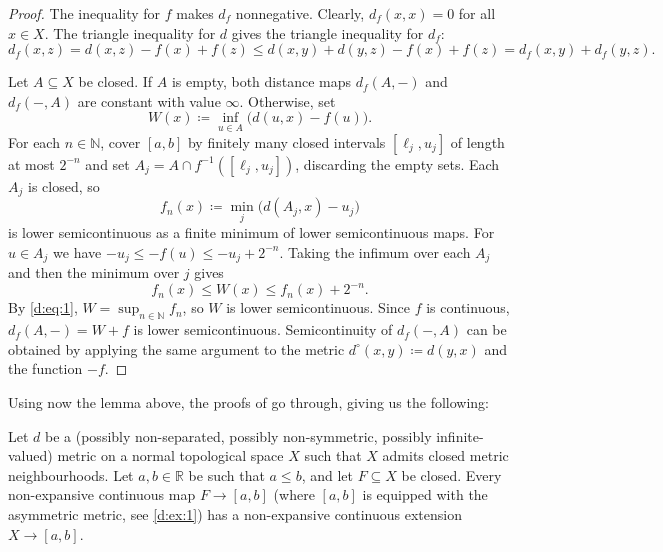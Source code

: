 \documentclass[11pt]{amsart}
\theoremstyle{definition}
\newcommand{\N}{\mathbb{N}}
\newcommand{\R}{\mathbb{R}}
\begin{document}
\begin{proof}
  The inequality for $f$ makes $d_f$ nonnegative.
  Clearly, $d_f(x,x) = 0$ for all $x \in X$.
  The triangle inequality for $d$ gives the triangle inequality for $d_f$:
  \[
    d_f(x,z) = d(x,z) - f(x) + f(z)
    \leq d(x,y) + d(y,z) - f(x) + f(z) = d_f(x,y) + d_f(y,z).
  \]

  Let $A\subseteq X$ be closed. If $A$ is empty, both distance maps $d_f(A,-)$ and $d_f(-,A)$ are constant with value $\infty$. Otherwise, set
  \[
    W(x)\coloneqq\inf_{u\in A}\bigl(d(u,x)-f(u)\bigr).
  \]
  For each $n\in\N$, cover $[a,b]$ by finitely many closed intervals $[\ell_j,u_j]$ of length at most $2^{-n}$ and set $A_j=A\cap f^{-1}([\ell_j,u_j])$, discarding the empty sets. Each $A_j$ is closed, so
  \[
    f_n(x)\coloneqq\min_j\bigl(d(A_j,x)-u_j\bigr)
  \]
  is lower semicontinuous as a finite minimum of lower semicontinuous maps.
  For $u\in A_j$ we have $-u_j\leq -f(u)\leq -u_j+2^{-n}$.
  Taking the infimum over each $A_j$ and then the minimum over $j$ gives
  \begin{equation}\label{d:eq:1}
    f_n(x)\leq W(x)\leq f_n(x)+2^{-n}.
  \end{equation}
  By \eqref{d:eq:1}, $W=\sup_{n\in\N}f_n$, so $W$ is lower semicontinuous.
  Since $f$ is continuous, $d_f(A,-)=W+f$ is lower semicontinuous.
  Semicontinuity of $d_f(-,A)$ can be obtained by applying the same argument to the metric $d^{\circ}(x,y) \coloneqq d(y,x)$ and the function $-f$.
\end{proof}

Using now the lemma above, the proofs of \cite[Thms.~2.2 and 2.4]{Mat00} go through, giving us the following:

\begin{theorem}
  \label{t:TIetze-Urysohn}
  Let $d$ be a (possibly non-separated, possibly non-symmetric, possibly infinite-valued) metric on a normal topological space $X$ such that \(X\) admits closed metric neighbourhoods.
  Let $a,b \in \R$ be such that $a \leq b$, and let $F \subseteq X$ be closed. Every non-expansive continuous map $F \to [a,b]$  (where $[a,b]$ is equipped with the asymmetric metric, see \cref{d:ex:1}) has a non-expansive continuous extension $X \to [a,b]$.
\end{theorem}
\end{document}
